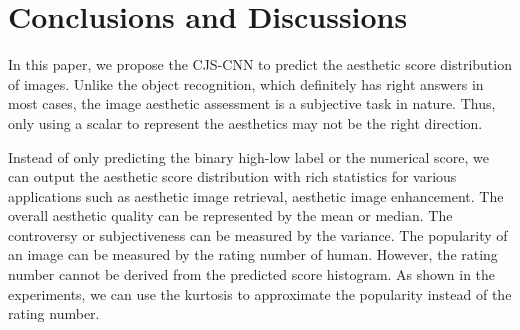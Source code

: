 \documentclass[letterpaper]{article} %
\begin{document}
%
%
%



\section{Conclusions and Discussions}
In this paper, we propose the CJS-CNN to predict the aesthetic score distribution of images. Unlike the object recognition, which definitely has right answers in most cases, the image aesthetic assessment is a subjective task in nature. Thus, only using a scalar to represent the aesthetics may not be the right direction.

Instead of only predicting the binary high-low label or the numerical score, we can output the aesthetic score distribution with rich statistics for various applications such as aesthetic image retrieval, aesthetic image enhancement. The overall aesthetic quality can be represented by the mean or median. The controversy or subjectiveness can be measured by the variance. The popularity of an image can be measured by the rating number of human. However, the rating number cannot be derived from the predicted score histogram. As shown in the experiments, we can use the kurtosis to approximate the popularity instead of the rating number.
\end{document}
